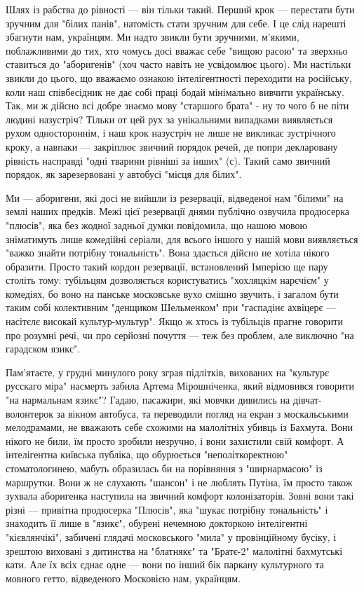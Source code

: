 Шлях із рабства до рівності --- він тільки такий. Перший крок --- перестати бути
зручним для "білих панів", натомість стати зручним для себе. І це слід нарешті
збагнути нам, українцям. Ми надто звикли бути зручними, м’якими, поблажливими
до тих, хто чомусь досі вважає себе "вищою расою" та зверхньо ставиться до
"аборигенів" (хоч часто навіть не усвідомлює цього). Ми настільки звикли до
цього, що вважаємо ознакою інтелігентності переходити на російську, коли наш
співбесідник не дає собі праці бодай мінімально вивчити українську. Так, ми ж
дійсно всі добре знаємо мову "старшого брата" - ну то чого б не піти людині
назустріч? Тільки от цей рух за унікальними випадками виявляється рухом
одностороннім, і наш крок назустріч не лише не викликає зустрічного кроку, а
навпаки --- закріплює звичний порядок речей, де попри декларовану рівність
насправді "одні тварини рівніші за інших" (с). Такий само звичний порядок, як
зарезервовані у автобусі "місця для білих".

Ми --- аборигени, які досі не вийшли із резервації, відведеної нам "білими" на
землі наших предків. Межі цієї резервації днями публічно озвучила продюсерка
"плюсів", яка без жодної задньої думки повідомила, що нашою мовою зніматимуть
лише комедійні серіали, для всього іншого у нашій мови виявляється "важко
знайти потрібну тональність". Вона здається дійсно не хотіла нікого образити.
Просто такий кордон резервації, встановлений Імперією ще пару століть тому:
тубільцям дозволяється користуватись "хохляцкім нарєчієм" у комедіях, бо воно
на панське московське вухо смішно звучить, і загалом бути таким собі
колективним "денщиком Шельменком" при "гаспадінє ахвіцерє --- насітєлє високай
культур-мультур". Якщо ж хтось із тубільців прагне говорити про розумні речі,
чи про серйозні почуття --- теж без проблем, але виключно "на гарадском язикє".

Пам’ятаєте, у грудні минулого року зграя підлітків, вихованих на "культурє
русскаго міра" насмерть забила Артема Мірошніченка, який відмовився говорити
"на нармальнам язикє"? Гадаю, пасажири, які мовчки дивились на
дівчат-волонтерок за вікном автобуса, та переводили погляд на екран з
москальськими мелодрамами, не вважають себе схожими на малолітніх убивць із
Бахмута. Вони нікого не били, їм просто зробили незручно, і вони захистили свій
комфорт. А інтелігентна київська публіка, що обурюється "неполіткоректною"
стоматологинею, мабуть образилась би на порівняння з "ширнармасою" із
маршрутки. Вони ж не слухають "шансон" і не люблять Путіна, їм просто також
зухвала аборигенка наступила на звичний комфорт колонізаторів. Зовні вони такі
різні --- привітна продюсерка "Плюсів", яка "шукає потрібну тональність" і
знаходить її лише в "язикє", обурені нечемною докторкою інтелігентні
"кієвлянчікі", забичені глядачі московського "мила" у провінційному бусіку, і
зрештою виховані з дитинства на "блатнякє" та "Братє-2" малолітні бахмутські
кати. Але їх всіх єднає одне --- вони по інший бік паркану культурного та мовного
гетто, відведеного Московією нам, українцям.

